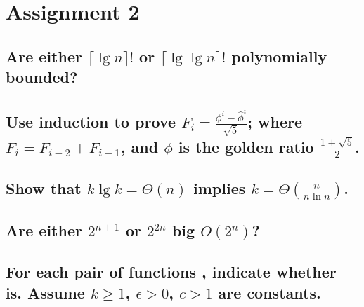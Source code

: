 \chapter{Assignment 2}

\section[Problem 1]{Are either $\lceil \lg n \rceil!$ or $\lceil \lg \lg n \rceil!$ polynomially bounded?}
\section[Problem 2]{Use induction to prove $F_i = \frac{\phi^i - \hat{\phi}^i}{\sqrt{5}}$; where $F_i = F_{i-2} + F_{i-1}$, and $\phi$ is the golden ratio $\frac{1 + \sqrt{5}}{2}$.}
\section[Problem 3]{Show that $k \lg k = \Theta(n)$ implies $k = \Theta\left(\frac{n}{n \ln n}\right)$.}
\section[Problem 4]{Are either $2^{n + 1}$ or $2^{2n}$ big $O(2^n)$?}
\section[Problem 5]{For each pair of functions $ $, indicate whether $ $ is. Assume $k \geq 1$, $\epsilon > 0$, $c > 1$ are constants.}
\section[Problem 6]{}
